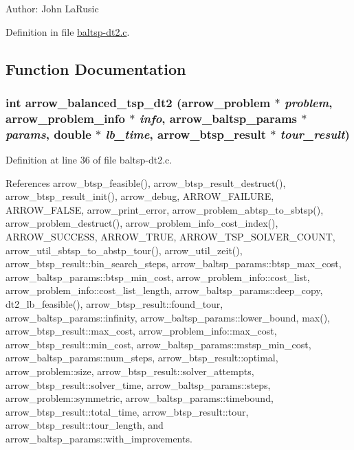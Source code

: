 \begin{Desc}
\item[Author:]John LaRusic \end{Desc}


Definition in file \hyperlink{lib_2baltsp_2baltsp-dt2_8c-source}{baltsp-dt2.c}.

\subsection{Function Documentation}
\hypertarget{lib_2baltsp_2baltsp-dt2_8c_9e38b4149294169d7385216213f247fe}{
\subsubsection[{arrow\_\-balanced\_\-tsp\_\-dt2}]{\setlength{\rightskip}{0pt plus 5cm}int arrow\_\-balanced\_\-tsp\_\-dt2 ({\bf arrow\_\-problem} $\ast$ {\em problem}, \/  {\bf arrow\_\-problem\_\-info} $\ast$ {\em info}, \/  {\bf arrow\_\-baltsp\_\-params} $\ast$ {\em params}, \/  double $\ast$ {\em lb\_\-time}, \/  {\bf arrow\_\-btsp\_\-result} $\ast$ {\em tour\_\-result})}}
\label{lib_2baltsp_2baltsp-dt2_8c_9e38b4149294169d7385216213f247fe}




Definition at line 36 of file baltsp-dt2.c.

References arrow\_\-btsp\_\-feasible(), arrow\_\-btsp\_\-result\_\-destruct(), arrow\_\-btsp\_\-result\_\-init(), arrow\_\-debug, ARROW\_\-FAILURE, ARROW\_\-FALSE, arrow\_\-print\_\-error, arrow\_\-problem\_\-abtsp\_\-to\_\-sbtsp(), arrow\_\-problem\_\-destruct(), arrow\_\-problem\_\-info\_\-cost\_\-index(), ARROW\_\-SUCCESS, ARROW\_\-TRUE, ARROW\_\-TSP\_\-SOLVER\_\-COUNT, arrow\_\-util\_\-sbtsp\_\-to\_\-abstp\_\-tour(), arrow\_\-util\_\-zeit(), arrow\_\-btsp\_\-result::bin\_\-search\_\-steps, arrow\_\-baltsp\_\-params::btsp\_\-max\_\-cost, arrow\_\-baltsp\_\-params::btsp\_\-min\_\-cost, arrow\_\-problem\_\-info::cost\_\-list, arrow\_\-problem\_\-info::cost\_\-list\_\-length, arrow\_\-baltsp\_\-params::deep\_\-copy, dt2\_\-lb\_\-feasible(), arrow\_\-btsp\_\-result::found\_\-tour, arrow\_\-baltsp\_\-params::infinity, arrow\_\-baltsp\_\-params::lower\_\-bound, max(), arrow\_\-btsp\_\-result::max\_\-cost, arrow\_\-problem\_\-info::max\_\-cost, arrow\_\-btsp\_\-result::min\_\-cost, arrow\_\-baltsp\_\-params::mstsp\_\-min\_\-cost, arrow\_\-baltsp\_\-params::num\_\-steps, arrow\_\-btsp\_\-result::optimal, arrow\_\-problem::size, arrow\_\-btsp\_\-result::solver\_\-attempts, arrow\_\-btsp\_\-result::solver\_\-time, arrow\_\-baltsp\_\-params::steps, arrow\_\-problem::symmetric, arrow\_\-baltsp\_\-params::timebound, arrow\_\-btsp\_\-result::total\_\-time, arrow\_\-btsp\_\-result::tour, arrow\_\-btsp\_\-result::tour\_\-length, and arrow\_\-baltsp\_\-params::with\_\-improvements.

